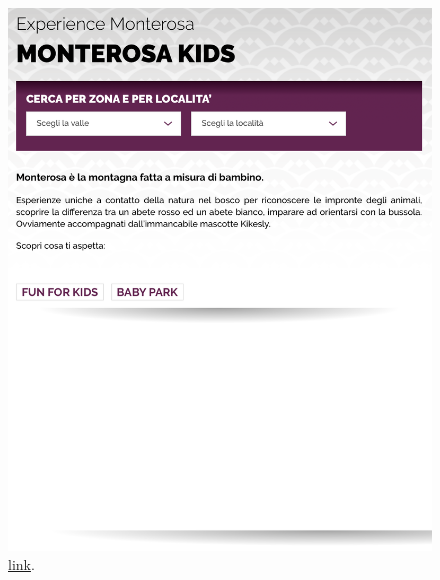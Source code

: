 \documentclass[a4paper, 11pt, parskip=half, headsepline]{scrreprt}
\begin{document}
\begin{figure}[H]
\begin{minipage}[t]{0.5\textwidth}
        \includegraphics[width=1\linewidth, keepaspectratio]{12-interaction-consistency}
        \caption{\href{https://www.visitmonterosa.com/experience-monterosa/famigliare/}{link}.}
        \label{fig:interaction-consistency-02}
    \end{minipage} 
\end{figure}
\end{document}
